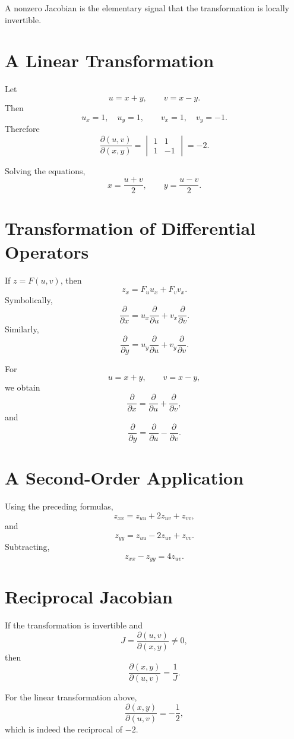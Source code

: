 \documentclass[11pt,oneside]{book}
\theoremstyle{studentthm}
\theoremstyle{definition}
\begin{document}
A nonzero Jacobian is the elementary signal that the transformation is
locally invertible.

\section{A Linear Transformation}

Let
\[
u=x+y,
\qquad
v=x-y.
\]
Then
\[
u_x=1,\quad u_y=1,
\qquad
v_x=1,\quad v_y=-1.
\]
Therefore
\[
\frac{\partial(u,v)}{\partial(x,y)}
=
\begin{vmatrix}
1&1\\
1&-1
\end{vmatrix}
=-2.
\]

Solving the equations,
\[
x=\frac{u+v}{2},
\qquad
y=\frac{u-v}{2}.
\]

\section{Transformation of Differential Operators}

If \(z=F(u,v)\), then
\[
z_x=F_u u_x+F_v v_x.
\]
Symbolically,
\[
\frac{\partial}{\partial x}
=
u_x\frac{\partial}{\partial u}
+
v_x\frac{\partial}{\partial v}.
\]
Similarly,
\[
\frac{\partial}{\partial y}
=
u_y\frac{\partial}{\partial u}
+
v_y\frac{\partial}{\partial v}.
\]

For
\[
u=x+y,\qquad v=x-y,
\]
we obtain
\[
\frac{\partial}{\partial x}
=
\frac{\partial}{\partial u}
+
\frac{\partial}{\partial v},
\]
and
\[
\frac{\partial}{\partial y}
=
\frac{\partial}{\partial u}
-
\frac{\partial}{\partial v}.
\]

\section{A Second-Order Application}

Using the preceding formulas,
\[
z_{xx}
=
z_{uu}+2z_{uv}+z_{vv},
\]
and
\[
z_{yy}
=
z_{uu}-2z_{uv}+z_{vv}.
\]
Subtracting,
\[
z_{xx}-z_{yy}=4z_{uv}.
\]

\section{Reciprocal Jacobian}

If the transformation is invertible and
\[
J=
\frac{\partial(u,v)}{\partial(x,y)}
\ne0,
\]
then
\[
\frac{\partial(x,y)}{\partial(u,v)}
=
\frac1J.
\]

For the linear transformation above,
\[
\frac{\partial(x,y)}{\partial(u,v)}
=
-\frac12,
\]
which is indeed the reciprocal of \(-2\).
\end{document}
